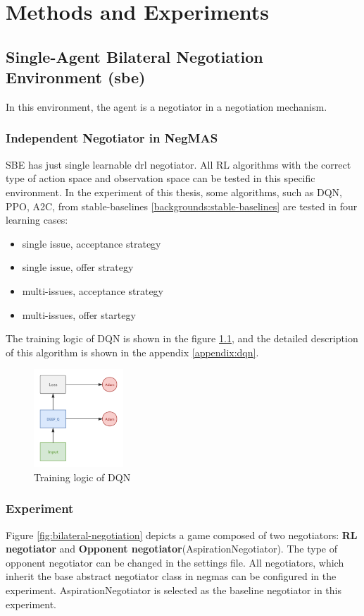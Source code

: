 \chapter{Methods and Experiments} \label{methods-and-experiments}

\section{Single-Agent Bilateral Negotiation Environment (\gls{sbe})}
In this environment, the agent is a negotiator in a negotiation mechanism.

\subsection{Independent Negotiator in NegMAS}
SBE has just single learnable \gls{drl} negotiator. All RL algorithms with the correct type of action space and observation space can be tested in this specific environment. In the experiment of this thesis, some algorithms, such as DQN, PPO, A2C, from stable-baselines \ref{backgrounds:stable-baselines} are tested in four learning cases:
\begin{itemize}
	\item single issue, acceptance strategy
	\item single issue, offer strategy
	\item multi-issues, acceptance strategy
	\item multi-issues, offer startegy
\end{itemize}

The training logic of DQN is shown in the figure \ref{fig:dqn}, and the detailed description of this algorithm is shown in the appendix \ref{appendix:dqn}.

\begin{figure}[htbp]
\centering
\includegraphics[width=0.30\textwidth]{./images/dqn.png}
\caption{Training logic of DQN}
\label{fig:dqn}
\end{figure}

\subsection{Experiment} \label{sbe:experiment}
Figure \ref{fig:bilateral-negotiation} depicts a game composed of two negotiators: \textbf{RL negotiator} and \textbf{Opponent negotiator}(AspirationNegotiator). The type of opponent negotiator can be changed in the settings file. All negotiators, which inherit the base abstract negotiator class in \gls{negmas} can be configured in the experiment. AspirationNegotiator is selected as the baseline negotiator in this experiment.


